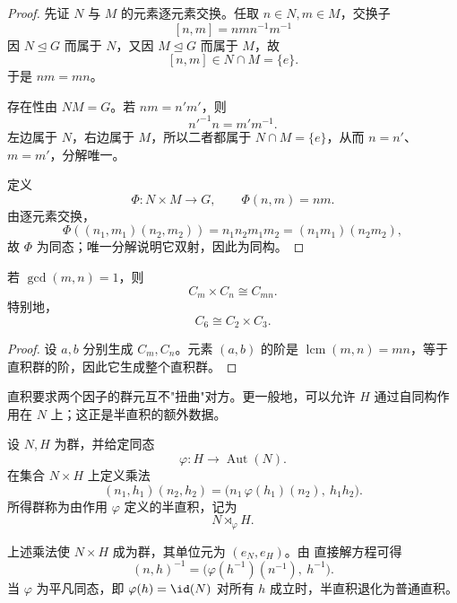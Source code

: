 \begin{proof}
先证 $N$ 与 $M$ 的元素逐元素交换。任取 $n\in N,m\in M$，交换子
\[
[n,m]=nmn^{-1}m^{-1}
\]
因 $N\mathrel{\trianglelefteq} G$ 而属于 $N$，又因 $M\mathrel{\trianglelefteq} G$ 而属于 $M$，故
\[
[n,m]\in N\cap M=\{e\}.
\]
于是 $nm=mn$。

存在性由 $NM=G$。若 $nm=n'm'$，则
\[
n'^{-1}n=m'm^{-1}.
\]
左边属于 $N$，右边属于 $M$，所以二者都属于 $N\cap M=\{e\}$，从而 $n=n'$、$m=m'$，分解唯一。

定义
\[
\Phi:N\times M\to G,
\qquad
\Phi(n,m)=nm.
\]
由逐元素交换，
\[
\Phi((n_1,m_1)(n_2,m_2))
=n_1n_2m_1m_2
=(n_1m_1)(n_2m_2),
\]
故 $\Phi$ 为同态；唯一分解说明它双射，因此为同构。
\end{proof}

\begin{corollary}[互素循环群的直积分解]
若 $\gcd(m,n)=1$，则
\[
C_m\times C_n\cong C_{mn}.
\label{eq:coprime-cyclic-product}
\]
特别地，
\[
C_6\cong C_2\times C_3.
\]
\label{cor:coprime-cyclic-product}

\end{corollary}

\begin{proof}
设 $a,b$ 分别生成 $C_m,C_n$。元素 $(a,b)$ 的阶是 $\operatorname{lcm}(m,n)=mn$，等于直积群的阶，因此它生成整个直积群。
\end{proof}

直积要求两个因子的群元互不"扭曲"对方。更一般地，可以允许 $H$ 通过自同构作用在 $N$ 上；这正是半直积的额外数据。

\begin{definition}[外半直积]
设 $N,H$ 为群，并给定同态
\[
\varphi:H\longrightarrow\operatorname{Aut}(N).
\]
在集合 $N\times H$ 上定义乘法
\[
(n_1,h_1)(n_2,h_2)
=
\bigl(n_1\,\varphi(h_1)(n_2),\ h_1h_2\bigr).
\label{eq:semidirect-product}
\]
所得群称为由作用 $\varphi$ 定义的半直积，记为
\[
N\rtimes_{\varphi}H.
\]
\label{def:semidirect-product}
\end{definition}

\begin{proposition}[外半直积的群结构]

上述乘法使 $N\times H$ 成为群，其单位元为 $(e_N,e_H)$。由 直接解方程可得
\[
(n,h)^{-1}
=
\bigl(\varphi(h^{-1})(n^{-1}),\ h^{-1}\bigr).
\label{eq:semidirect-inverse}
\]
当 $\varphi$ 为平凡同态，即 $\varphi(h)=\id(N)$ 对所有 $h$ 成立时，半直积退化为普通直积。

\end{proposition}

